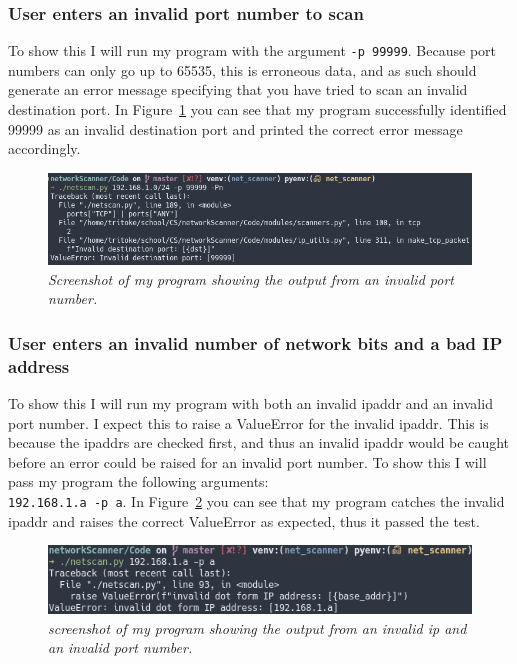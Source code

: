 \documentclass[titlepage]{article}
\let\Oldsubsubsection\subsubsection{}
\renewcommand{\subsubsection}{\FloatBarrier\Oldsubsubsection}
\begin{document}
\subsubsection{User enters an invalid port number to scan}
To show this I will run my program with the argument \verb|-p 99999|.
Because port numbers can only go up to 65535, this is erroneous data,
and as such should generate an error message specifying that 
you have tried to scan an invalid destination port.
In Figure~\ref{invalidportnum} you can see that my program
successfully identified 99999 as an invalid destination port
and printed the correct error message accordingly.

\begin{figure}[H]
\centering
\includegraphics[width=\textwidth]{invalidportnum.png}
\caption{\textit{%
  Screenshot of my program showing the output from an invalid port number.
}}\label{invalidportnum}
\end{figure}

\subsubsection{User enters an invalid number of network bits and a bad IP address}
To show this I will run my program with both an invalid \gls{ipaddr} and an
invalid port number. I expect this to raise a ValueError for the invalid \gls{ipaddr}.
This is because the \glspl{ipaddr} are checked first, and thus an invalid \gls{ipaddr}
would be caught before an error could be raised for an invalid port number.
To show this I will pass my program the following arguments: \\
\verb|192.168.1.a -p a|. In Figure~\ref{invalidipandport} you can see that
my program catches the invalid \gls{ipaddr} and raises the correct ValueError
as expected, thus it passed the test.

\begin{figure}[H]
\centering
\includegraphics[width=\textwidth]{invalidipandport.png}
\caption{\textit{%
  screenshot of my program showing the output from an invalid ip and an invalid port number.
}}\label{invalidipandport}
\end{figure}
\end{document}

